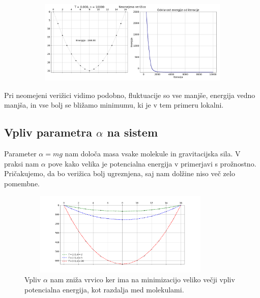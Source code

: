 \documentclass[11pt, a4paper]{article}
\begin{document}
\begin{figure}[H]

\centering
  \includegraphics[width=16cm, height=4cm]{neomejena_globina_T0.png}

\end{figure} 
Pri neomejeni verižici vidimo podobno, fluktuacije so vse manjše, energija vedno manjša, in vse bolj se bližamo minimumu, ki je v tem primeru lokalni.
\subsection{Vpliv parametra $\alpha$ na sistem}
Parameter $\alpha = mg$ nam določa masa vsake molekule in gravitacijska sila. V praksi nam $\alpha$ pove kako velika je potencialna energija v primerjavi s prožnostno. Pričakujemo, da bo verižica bolj ugreznjena, saj nam dolžine niso več zelo pomembne.
\begin{figure}[H]

\centering
  \includegraphics[width=10cm, height=4cm]{alfa.png}
\caption{Vpliv $\alpha$ nam zniža vrvico ker ima na minimizacijo veliko večji vpliv potencialna energija, kot razdalja med molekulami.}
\end{figure} 
\end{document}
